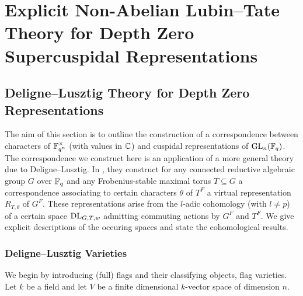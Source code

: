 \documentclass[../main.tex]{subfiles}
\begin{document}
\section{Explicit Non-Abelian Lubin--Tate Theory for Depth Zero Supercuspidal
Representations} %
\label{sec:Explicit Non-Abelian Lubin-Tate Theory for Depth Zero Supercuspidal Representations}

\subsection{Deligne--Lusztig Theory for Depth Zero Representations} %
\label{sub:Deligne-Lusztig Theory for Depth Zero Representations}
The aim of this section is to outline the construction of a correspondence
between characters of $\mathbb{F}_{q^n}^\times$ (with values in $\mathbb{C}$) and 
cuspidal representations of $\operatorname{GL}_n(\mathbb{F}_q)$. The correspondence we construct here
is an application of a more general theory due to Deligne--Lusztig. 
In \cite{delignelusztig1976}, they construct
for any connected reductive algebraic group $G$ over $\mathbb{F}_q$ and any
Frobenius-stable 
maximal torus $T \subseteq G$ a correspondence associating to certain
characters $\theta$ of $T^F$ a virtual representation $R_{T,\theta}$ of 
$G^F$. These representations arise from the $l$-adic cohomology (with $l \neq p$)
of a certain space $\mathrm{DL}_{G,T,w}$ admitting commuting actions by $G^F$ and $T^F$. 
We give explicit descriptions of the occuring spaces and state the cohomological 
results.

\subsubsection{Deligne--Lusztig Varieties} %
\label{ssub:Deligne--Lusztig Varieties}
We begin by introducing (full) flags and their classifying objects, flag
varieties. Let $k$ be a field and let $V$ be a finite dimensional $k$-vector space
of dimension $n$.
\end{document}
